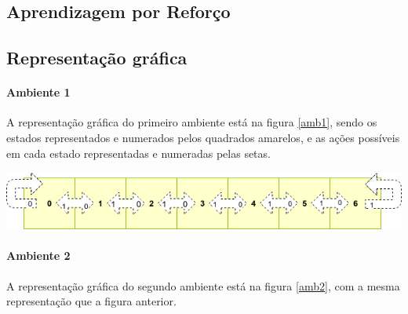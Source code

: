 \documentclass[12pt,a4paper]{article}
\newenvironment{Figure}
  {\par\medskip\noindent\minipage{\linewidth}}
  {\endminipage\par\medskip}
\begin{document}
\begin{multicols}{2}
	\section{Aprendizagem por Reforço}
	
	\subsection{Representação gráfica}
	\paragraph{Ambiente 1}
	
	A representação gráfica do primeiro ambiente está na figura \ref{amb1},
	sendo os estados representados e numerados pelos quadrados amarelos, e
	as ações possíveis em cada estado representadas e numeradas pelas setas.
	
	\begin{Figure}
		\centering
		\includegraphics[width=1\textwidth]{ambiente1}
		\label{amb1}
	\end{Figure}

	\paragraph{Ambiente 2}

	A representação gráfica do segundo ambiente está na figura \ref{amb2},
	com a mesma representação que a figura anterior.
	

\end{multicols}
\end{document}
